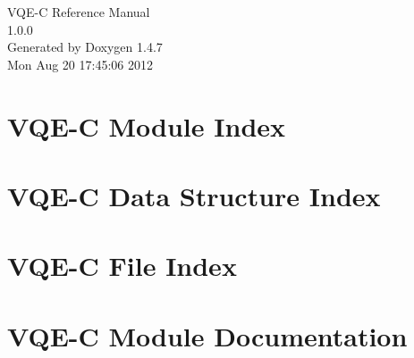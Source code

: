 \documentclass[a4paper]{book}
\begin{document}
\begin{titlepage}
\vspace*{7cm}
\begin{center}
{\Large VQE-C Reference Manual\\[1ex]\large 1.0.0 }\\
\vspace*{1cm}
{\large Generated by Doxygen 1.4.7}\\
\vspace*{0.5cm}
{\small Mon Aug 20 17:45:06 2012}\\
\end{center}
\end{titlepage}
\clearemptydoublepage
{}
\tableofcontents
\clearemptydoublepage
{}
\chapter{VQE-C Module Index}

\chapter{VQE-C Data Structure Index}

\chapter{VQE-C File Index}

\chapter{VQE-C Module Documentation}



\end{document}

